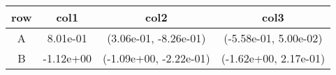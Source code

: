 \begin{tabular}{cccc}
\toprule
row&col1&col2&col3\tabularnewline
\midrule
A&8.01e-01& (3.06e-01, -8.26e-01)& (-5.58e-01, 5.00e-02)\tabularnewline
B&-1.12e+00& (-1.09e+00, -2.22e-01)& (-1.62e+00, 2.17e-01)\tabularnewline
\bottomrule
\end{tabular}
